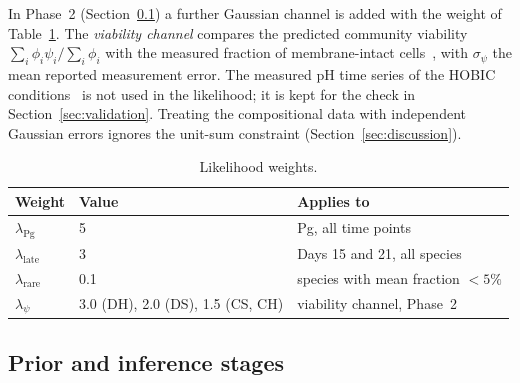 \documentclass[11pt,a4paper]{article}
\begin{document}
In Phase~2 (Section~\ref{sec:prior}) a further Gaussian channel is added with the weight of Table~\ref{tab:weights}.
The \emph{viability channel} compares the predicted community viability $\sum_i\phi_i\psi_i/\sum_i\phi_i$ with the measured fraction of membrane-intact cells~\cite{heine2025influence}, with $\sigma_\psi$ the mean reported measurement error.
The measured pH time series of the HOBIC conditions~\citep{heine2025influence} is not used in the likelihood; it is kept for the check in Section~\ref{sec:validation}.
Treating the compositional data with independent Gaussian errors ignores the unit-sum constraint (Section~\ref{sec:discussion}).

\begin{table}[htbp]\centering\small
\begin{tabular}{@{}lll@{}}\toprule
Weight & Value & Applies to\\\midrule
$\lambda_{\mathrm{Pg}}$ & 5 & Pg, all time points\\
$\lambda_{\mathrm{late}}$ & 3 & Days 15 and 21, all species\\
$\lambda_{\mathrm{rare}}$ & 0.1 & species with mean fraction $<5\%$\\
$\lambda_{\psi}$ & 3.0 (DH), 2.0 (DS), 1.5 (CS, CH) & viability channel, Phase~2\\\bottomrule
\end{tabular}
\caption{Likelihood weights.}
\label{tab:weights}
\end{table}

\subsection{Prior and inference stages}
\label{sec:prior}
\end{document}
